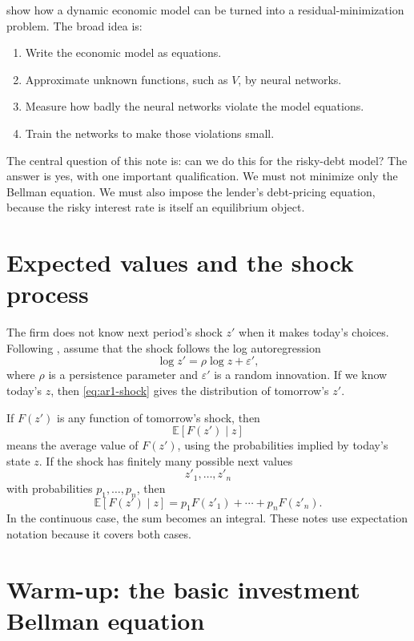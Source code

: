 \documentclass[11pt]{article}
\newcommand{\E}{\mathbb{E}}
\newcommand{\1}{\mathbf{1}}
\begin{document}
\citet[Definition 2.8 and Algorithm 1]{maliar2021deep} show how a dynamic
economic model can be turned into a residual-minimization problem. The broad
idea is:
\begin{enumerate}[leftmargin=2em]
  \item Write the economic model as equations.
  \item Approximate unknown functions, such as \(V\), by neural networks.
  \item Measure how badly the neural networks violate the model equations.
  \item Train the networks to make those violations small.
\end{enumerate}

The central question of this note is: can we do this for the risky-debt model?
The answer is yes, with one important qualification. We must not minimize only
the Bellman equation. We must also impose the lender's debt-pricing equation,
because the risky interest rate is itself an equilibrium object.

\section{Expected values and the shock process}

The firm does not know next period's shock \(z'\) when it makes today's choices.
Following \citet[eq. (3.9)]{strebulaev2012dynamic}, assume that the shock follows
the log autoregression
\begin{equation}
  \log z' = \rho \log z + \varepsilon',
  \label{eq:ar1-shock}
\end{equation}
where \(\rho\) is a persistence parameter and \(\varepsilon'\) is a random
innovation. If we know today's \(z\), then \cref{eq:ar1-shock} gives the
distribution of tomorrow's \(z'\).

If \(F(z')\) is any function of tomorrow's shock, then
\[
  \E[F(z')\mid z]
\]
means the average value of \(F(z')\), using the probabilities implied by today's
state \(z\). If the shock has finitely many possible next values
\[
  z'_1,\ldots,z'_n
\]
with probabilities \(p_1,\ldots,p_n\), then
\[
  \E[F(z')\mid z] = p_1F(z'_1)+\cdots+p_nF(z'_n).
\]
In the continuous case, the sum becomes an integral. These notes use expectation
notation because it covers both cases.

\section{Warm-up: the basic investment Bellman equation}
\end{document}
